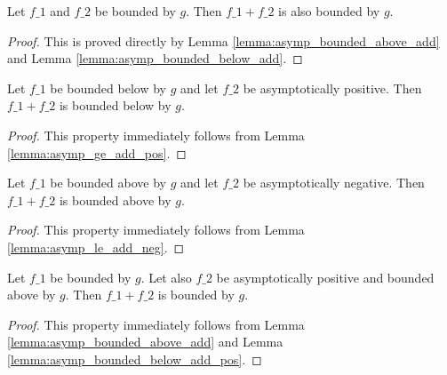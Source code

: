 \begin{theorem}
    \label{thm:asymp_bounded_add}
    \leanok
    Let $f\_1$ and $f\_2$ be bounded by $g$. Then $f\_1 + f\_2$ is also bounded by $g$.
\end{theorem}

\begin{proof}
    \leanok
    This is proved directly by Lemma \ref{lemma:asymp_bounded_above_add} and Lemma
    \ref{lemma:asymp_bounded_below_add}.
\end{proof}

\begin{lemma}
    \label{lemma:asymp_bounded_below_add_pos}
    \leanok
    Let $f\_1$ be bounded below by $g$ and let $f\_2$ be asymptotically positive. 
    Then $f\_1 + f\_2$ is bounded below by $g$.
\end{lemma}

\begin{proof}
    \leanok
    This property immediately follows from Lemma \ref{lemma:asymp_ge_add_pos}.
\end{proof}

\begin{lemma}
    \label{lemma:asymp_bounded_above_add_neg}
    \leanok
    Let $f\_1$ be bounded above by $g$ and let $f\_2$ be asymptotically negative. 
    Then $f\_1 + f\_2$ is bounded above by $g$.
\end{lemma}

\begin{proof}
    \leanok
    This property immediately follows from Lemma \ref{lemma:asymp_le_add_neg}.
\end{proof}

\begin{theorem}
    \label{thm:asymp_bounded_add_pos_above}
    \leanok
    Let $f\_1$ be bounded by $g$. Let also $f\_2$ be asymptotically positive and
    bounded above by $g$. Then $f\_1 + f\_2$ is bounded by $g$.
\end{theorem}

\begin{proof}
    \leanok
    This property immediately follows from Lemma \ref{lemma:asymp_bounded_above_add}
    and Lemma \ref{lemma:asymp_bounded_below_add_pos}.
\end{proof}

